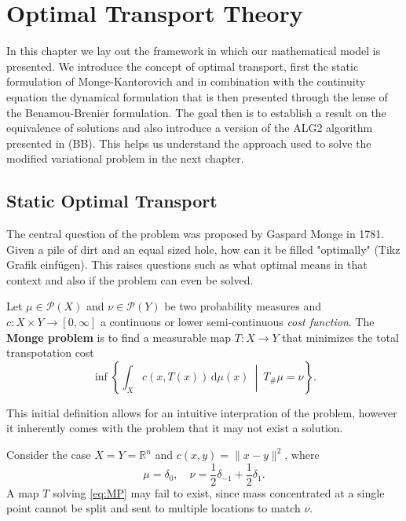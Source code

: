 \newpage
\section{Optimal Transport Theory}
\label{sec:ot}

In this chapter we lay out the framework in which our mathematical model is presented. We introduce the concept of optimal transport, first the static formulation of Monge-Kantorovich and in combination with the continuity equation the dynamical formulation that is then presented through the lense of the Benamou-Brenier formulation. The goal then is to establish a result on the equivalence of solutions and also introduce a version of the ALG2 algorithm presented in (BB). This helps us understand the approach used to solve the modified variational problem in the next chapter.
\subsection{Static Optimal Transport}
The central question of the problem was proposed by Gaspard Monge in 1781. Given a pile of dirt and an equal sized hole, how can it be filled "optimally" (Tikz Grafik einfügen). This raises questions such as what optimal means in that context and also if the problem can even be solved. 
\begin{definition}
	Let $\mu\in \mathscr{P}(X)$ and $\nu\in\mathscr{P}(Y)$ be two probability measures and $c:X\times Y\to[0,\infty]$ a continuous or lower semi-continuous \textit{cost function}. The \textbf{Monge problem} is to find a measurable map $T:X\to Y$ that minimizes the total transpotation cost
	\begin{equation*}\tag{MP}\label{eq:MP}
		\inf\left\{\int_X c(x,T(x))\, \mathrm{d}\mu(x)\ \middle|\ T_\#\mu = \nu\right\}.
	\end{equation*}
\end{definition}
This initial definition allows for an intuitive interpration of the problem, however it inherently comes with the problem that it may not exist a solution.
\begin{example}
	Consider the case $X=Y=\mathbb{R}^n$ and $c(x,y) = \lVert x-y\rVert^2$, where
	$$
	\mu = \delta_0,\quad \nu = \frac{1}{2}\delta_{-1} + \frac{1}{2}\delta_1.
	$$
	A map $T$ solving \eqref{eq:MP} may fail to exist, since mass concentrated at a single point cannot be split and sent to multiple locations to match $\nu$.
\end{example}
